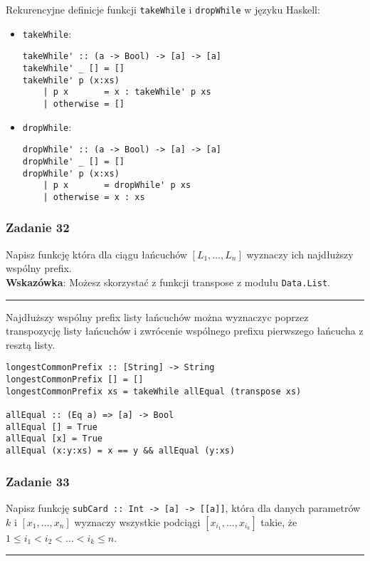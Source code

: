 \documentclass[11pt,a4paper]{article}
\begin{document}
Rekurencyjne definicje funkcji \texttt{takeWhile} i \texttt{dropWhile} w języku Haskell:
\begin{itemize}
    \item \texttt{takeWhile}:
        \begin{Verbatim}[frame=single]
takeWhile' :: (a -> Bool) -> [a] -> [a]
takeWhile' _ [] = []
takeWhile' p (x:xs)
    | p x       = x : takeWhile' p xs
    | otherwise = []
        \end{Verbatim}
    \item \texttt{dropWhile}:
        \begin{Verbatim}[frame=single]
dropWhile' :: (a -> Bool) -> [a] -> [a]
dropWhile' _ [] = []
dropWhile' p (x:xs)
    | p x       = dropWhile' p xs
    | otherwise = x : xs
        \end{Verbatim}
\end{itemize}

\subsubsection{Zadanie 32}
Napisz funkcję która dla ciągu łańcuchów $[L_1, \dots, L_n]$ wyznaczy ich najdłuższy wspólny prefix. \\
\textbf{Wskazówka}: Możesz skorzystać z funkcji transpose z modułu \texttt{Data.List}.

\bigskip
\hrule
\bigskip

Najdłuższy wspólny prefix listy łańcuchów można wyznaczyc poprzez transpozycję listy łańcuchów i zwrócenie wspólnego prefixu pierwszego łańcucha z resztą listy.
\begin{Verbatim}[frame=single]
longestCommonPrefix :: [String] -> String
longestCommonPrefix [] = []
longestCommonPrefix xs = takeWhile allEqual (transpose xs)

allEqual :: (Eq a) => [a] -> Bool
allEqual [] = True
allEqual [x] = True
allEqual (x:y:xs) = x == y && allEqual (y:xs)
\end{Verbatim}

\subsubsection{Zadanie 33}
Napisz funkcję \texttt{subCard :: Int -> [a] -> [[a]]}, która dla danych parametrów $k$ i $[x_1, \dots, x_n]$ wyznaczy wszystkie podciągi $[x_{i_1}, \dots, x_{i_k}]$ takie, że $1 \leq i_1 < i_2 < \dots < i_k \leq n$.

\bigskip
\hrule
\bigskip
\end{document}
